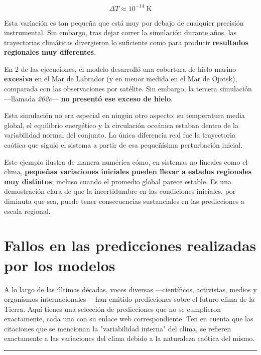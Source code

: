 \documentclass[
  10pt,
  a4paper,
  DIV=11,
  numbers=noendperiod,
  open=any]{scrreprt}
\numberwithin{equation}{chapter}
\numberwithin{equation}{section}
\renewcommand{\[}{\begin{equation}}
\renewcommand{\]}{\end{equation}}
\begin{document}
\begin{equation}
\Delta T \approx 10^{-14} \; \text{K}
\end{equation}

Esta variación es tan pequeña que está muy por debajo de cualquier
precisión instrumental. Sin embargo, tras dejar correr la simulación
durante años, las trayectorias climáticas divergieron lo suficiente como
para producir \textbf{resultados regionales muy diferentes}.

En 2 de las ejecuciones, el modelo desarrolló una cobertura de hielo
marino \textbf{excesiva} en el Mar de Labrador (y en menor medida en el
Mar de Ojotsk), comparada con las observaciones por satélite. Sin
embargo, la tercera simulación ---llamada \emph{262c}--- \textbf{no
presentó ese exceso de hielo}.

Esta simulación no era especial en ningún otro aspecto: su temperatura
media global, el equilibrio energético y la circulación oceánica estaban
dentro de la variabilidad normal del conjunto. La única diferencia real
fue la trayectoria caótica que siguió el sistema a partir de esa
pequeñísima perturbación inicial.

Este ejemplo ilustra de manera numérica cómo, en sistemas no lineales
como el clima, \textbf{pequeñas variaciones iniciales pueden llevar a
estados regionales muy distintos}, incluso cuando el promedio global
parece estable. Es una demostración clara de que la incertidumbre en las
condiciones iniciales, por diminuta que sea, puede tener consecuencias
sustanciales en las predicciones a escala regional.

\section{Fallos en las predicciones realizadas por los
modelos}\label{otros-fallos-en-las-predicciones-realizadas-por-los-modelos}

A lo largo de las últimas décadas, voces diversas ---científicos,
activistas, medios y organismos internacionales--- han emitido predicciones sobre el futuro clima de la Tierra. Aquí tienes una
selección de predicciones que no se cumplieron exactamente, cada una con su enlace
web correspondiente. Ten en cuenta que las citaciones que se mencionan la "variabilidad interna" del clima, se refieren exactamente a las variaciones del clima debido a la naturaleza caótica del mismo.

\begin{center}\rule{0.5\linewidth}{0.5pt}\end{center}
\end{document}
